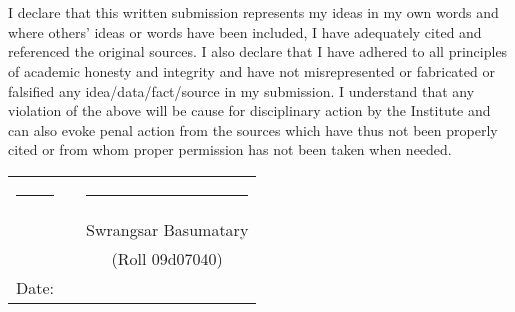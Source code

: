 \chapter*{}
\thispagestyle{empty}

I declare that this written submission represents my ideas in my own words
and where others' ideas or words have been included, I have adequately cited
and referenced the original sources. I also declare that I have adhered to all
principles of academic honesty and integrity and have not misrepresented or
fabricated or falsified any idea/data/fact/source in my submission. I
understand that any violation of the above will be cause for disciplinary
action by the Institute and can also evoke penal action from the sources which
have thus not been properly cited or from whom proper permission has not been
taken when needed.

\vspace{1.5cm}

\begin{tabular}{llc}
\rule{40mm}{0pt}        & \rule{50mm}{0pt}       & \rule{55mm}{0pt} \\
                        &                        & Swrangsar Basumatary \\
                        &                        & (Roll 09d07040)\\
Date:\dotfill           &                        & \\

\end{tabular}